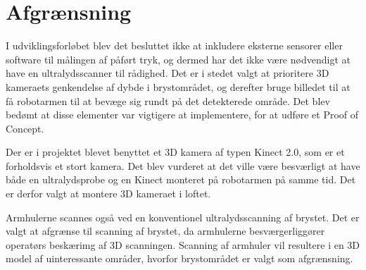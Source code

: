 \chapter{Afgrænsning}
\label{Afgransning}

I udviklingsforløbet blev det besluttet ikke at inkludere eksterne sensorer eller software til målingen af påført tryk, og dermed har det ikke være nødvendigt at have en ultralydsscanner til rådighed. Det er i stedet valgt at prioritere 3D kameraets genkendelse af dybde i brystområdet, og derefter bruge billedet til at få robotarmen til at bevæge sig rundt på det detekterede område. Det blev bedømt at disse elementer var vigtigere at implementere, for at udføre et Proof of Concept.

Der er i projektet blevet benyttet et 3D kamera af typen Kinect 2.0, som er et forholdsvis et stort kamera. Det blev vurderet at det ville være besværligt at have både en ultralydsprobe og en Kinect monteret på robotarmen på samme tid. Det er derfor valgt at montere 3D kameraet i loftet. 

Armhulerne scannes også ved en konventionel ultralydsscanning af brystet. Det er valgt at afgrænse til scanning af brystet, da armhulerne besværgerliggører operatørs beskærimg af 3D scanningen. Scanning af armhuler vil resultere i en 3D model af uinteressante områder, hvorfor brystområdet er valgt som afgrænsning.  
